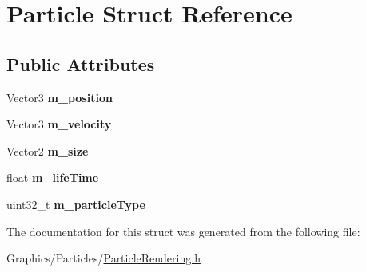 \hypertarget{structParticle}{}\section{Particle Struct Reference}
\label{structParticle}
\subsection*{Public Attributes}
\begin{DoxyCompactItemize}
\item 
\mbox{\label{structParticle_aa75c70c386148e4d3a661a261ee2ae11}} 
Vector3 {\bfseries m\+\_\+position}
\item 
\mbox{\label{structParticle_abcc28ba0c8b2a30a61255fe7f688d31d}} 
Vector3 {\bfseries m\+\_\+velocity}
\item 
\mbox{\label{structParticle_a3a1c32035681ecb166208e1579000f37}} 
Vector2 {\bfseries m\+\_\+size}
\item 
\mbox{\label{structParticle_a4b6f55302e7647d291eddbb6f671dad4}} 
float {\bfseries m\+\_\+life\+Time}
\item 
\mbox{\label{structParticle_a7fbb5694b020fac088e29a4112e81b62}} 
uint32\+\_\+t {\bfseries m\+\_\+particle\+Type}
\end{DoxyCompactItemize}


The documentation for this struct was generated from the following file\+:\begin{DoxyCompactItemize}
\item 
Graphics/\+Particles/\hyperlink{ParticleRendering_8h}{Particle\+Rendering.\+h}\end{DoxyCompactItemize}
